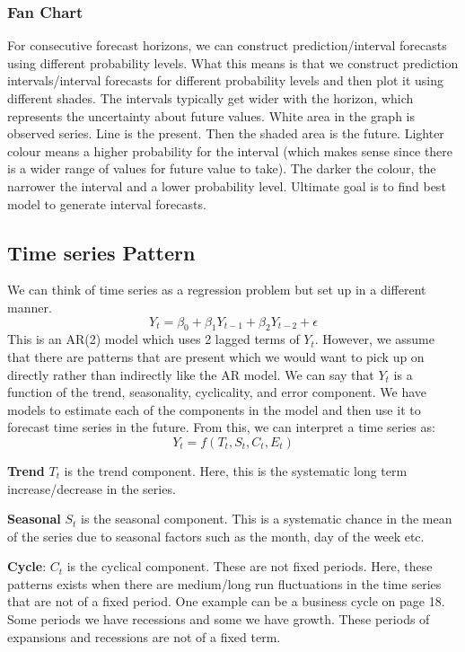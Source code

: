 \documentclass[11pt, oneside]{article}
\theoremstyle{definition}
\begin{document}
\subsubsection{Fan Chart}
For consecutive forecast horizons, we can construct prediction/interval forecasts using different probability levels. What this means is that we construct prediction intervals/interval forecasts for different probability levels and then plot it using different shades. The intervals typically get wider with the horizon, which represents the uncertainty about future values. White area in the graph is observed series. Line is the present. Then the shaded area is the future. Lighter colour means a higher probability for the interval (which makes sense since there is a wider range of values for future value to take). The darker the colour, the narrower the interval and a lower probability level. Ultimate goal is to find best model to generate interval forecasts.

\subsection{Time series Pattern}
We can think of time series as a regression problem but set up in a different manner.
$$
Y_{t} = \beta_0 + \beta_1Y_{t-1}+ \beta_2Y_{t-2} + \epsilon
$$
This is an AR(2) model which uses 2 lagged terms of $Y_t$. However, we assume that there are patterns that are present which we would want to pick up on directly rather than indirectly like the AR model. We can say that $Y_t$ is a function of the trend, seasonality, cyclicality, and error component. We have models to estimate each of the components in the model and then use it to forecast time series in the future. From this, we can interpret a time series as:
$$
Y_t = f(T_t, S_t, C_t, E_t)
$$

\textbf{Trend} $T_t$ is the trend component. Here, this is the systematic long term increase/decrease in the series.

\textbf{Seasonal} $S_t$ is the seasonal component. This is a systematic chance in the mean of the series due to seasonal factors such as the month, day of the week etc.

\textbf{Cycle}: $C_t$ is the cyclical component. These are not fixed periods. Here, these patterns exists when there are medium/long run fluctuations in the time series that are not of a fixed period. One example can be a business cycle on page 18. Some periods we have recessions and some we have growth. These periods of expansions and recessions are not of a fixed term.
\end{document}
